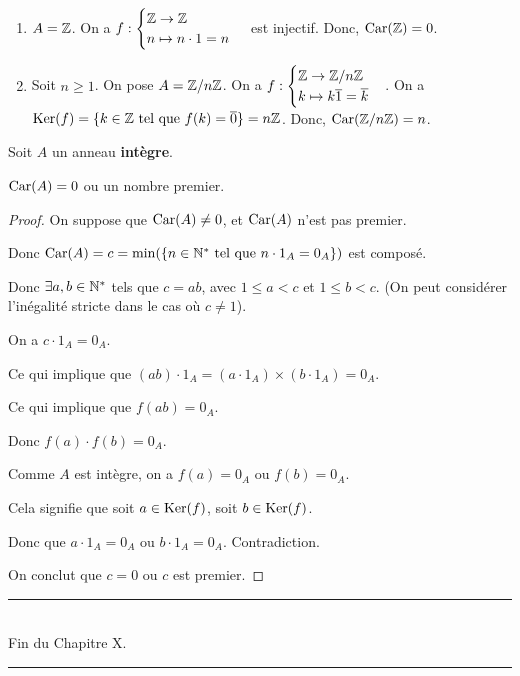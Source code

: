 \documentclass[12pt, a4paper]{report}
\begin{document}
\begin{example}
    \begin{enumerate}
        \item $A=\mathbb{Z}$. On a $f:\begin{cases}
        \mathbb{Z} \to \mathbb{Z} \\ n \mapsto n\cdot1 = n
        \end{cases}$ est injectif. Donc, $\mathrm{Car}(\mathbb{Z}) = 0$.
        \item Soit $n\ge 1$. On pose $A=\mathbb{Z}/n\mathbb{Z}$. On a $f:\begin{cases}
        \mathbb{Z} \to \mathbb{Z}/n\mathbb{Z} \\ k \mapsto k\overline{1}= \overline{k}
        \end{cases}$. On a $\mathrm{Ker}(f) = \{k\in\mathbb{Z}\text{ tel que } f(k) = \overline{0}\} = n\mathbb{Z}$. Donc, $\mathrm{Car}(\mathbb{Z}/n\mathbb{Z}) = n$.
    \end{enumerate}
\end{example}

\begin{property}
    Soit $A$ un anneau \textbf{intègre}.
    
    $\mathrm{Car}(A) = 0$ ou un nombre premier.
\end{property}

\begin{proof}
    On suppose que $\mathrm{Car}(A) \ne 0$, et $\mathrm{Car}(A)$ n'est pas premier.

    Donc $\mathrm{Car}(A) = c = \min(\{n\in\mathbb{N}^*\text{ tel que } n\cdot1_A = 0_A\})$ est composé.

    Donc $\exists a,b \in \mathbb{N}^*$ tels que $c = a b$, avec $1 \le a < c$ et $1 \le b < c$. (On peut considérer l'inégalité stricte dans le cas où $c\ne 1$).

    On a $c\cdot 1_A = 0_A$.

    Ce qui implique que $(a b)\cdot 1_A = (a\cdot 1_A) \times (b\cdot 1_A) = 0_A$.

    Ce qui implique que $f(ab)=0_A$.
    
    Donc $f(a)\cdot f(b) = 0_A$.

    Comme $A$ est intègre, on a $f(a) = 0_A$ ou $f(b) = 0_A$.

    Cela signifie que soit $a \in \mathrm{Ker}(f)$, soit $b \in \mathrm{Ker}(f)$.

    Donc que $a\cdot 1_A = 0_A$ ou $b \cdot 1_A = 0_A$. Contradiction.

    On conclut que $c=0$ ou $c$ est premier.
\end{proof}

\begin{center}
    \rule{0.5\textwidth}{1pt}\\
    Fin du Chapitre X.\\
    \rule{0.5\textwidth}{1pt}
\end{center}
\end{document}
